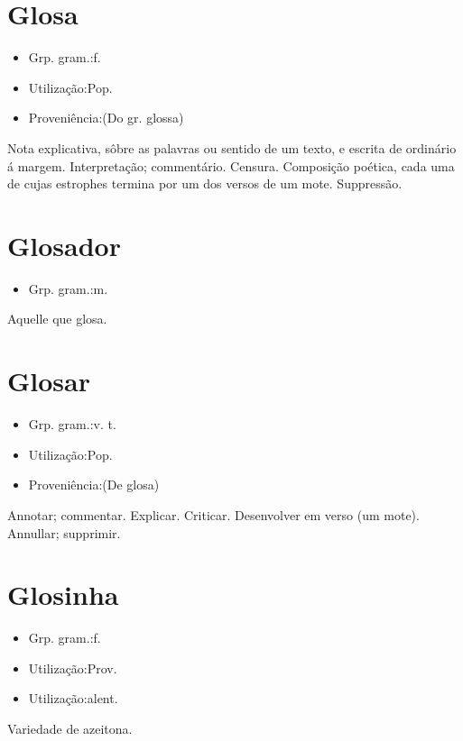 \section{Glosa}
\begin{itemize}
\item {Grp. gram.:f.}
\end{itemize}
\begin{itemize}
\item {Utilização:Pop.}
\end{itemize}
\begin{itemize}
\item {Proveniência:(Do gr. \textunderscore glossa\textunderscore )}
\end{itemize}
Nota explicativa, sôbre as palavras ou sentido de um texto, e escrita de ordinário á margem.
Interpretação; commentário.
Censura.
Composição poética, cada uma de cujas estrophes termina por um dos versos de um mote.
Suppressão.
\section{Glosador}
\begin{itemize}
\item {Grp. gram.:m.}
\end{itemize}
Aquelle que glosa.
\section{Glosar}
\begin{itemize}
\item {Grp. gram.:v. t.}
\end{itemize}
\begin{itemize}
\item {Utilização:Pop.}
\end{itemize}
\begin{itemize}
\item {Proveniência:(De \textunderscore glosa\textunderscore )}
\end{itemize}
Annotar; commentar.
Explicar.
Criticar.
Desenvolver em verso (um mote).
Annullar; supprimir.
\section{Glosinha}
\begin{itemize}
\item {Grp. gram.:f.}
\end{itemize}
\begin{itemize}
\item {Utilização:Prov.}
\end{itemize}
\begin{itemize}
\item {Utilização:alent.}
\end{itemize}
Variedade de azeitona.
